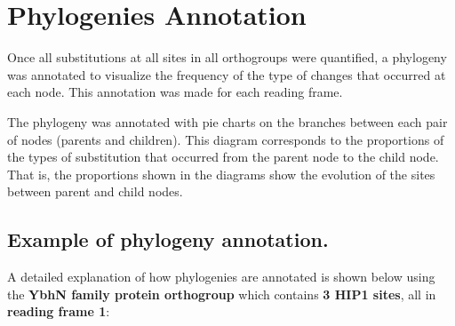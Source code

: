 \documentclass[
]{book}
\begin{document}
\hypertarget{phylogenies-annotation}{%
\section{Phylogenies Annotation}\label{phylogenies-annotation}}

Once all substitutions at all sites in all orthogroups were quantified, a phylogeny was annotated to visualize the frequency of the type of changes that occurred at each node. This annotation was made for each reading frame.

The phylogeny was annotated with pie charts on the branches between each pair of nodes (parents and children). This diagram corresponds to the proportions of the types of substitution that occurred from the parent node to the child node. That is, the proportions shown in the diagrams show the evolution of the sites between parent and child nodes.

\hypertarget{example-of-phylogeny-annotation.}{%
\subsection{Example of phylogeny annotation.}\label{example-of-phylogeny-annotation.}}

A detailed explanation of how phylogenies are annotated is shown below using the \textbf{YbhN family protein orthogroup} which contains \textbf{3 HIP1 sites}, all in \textbf{reading frame 1}:
\end{document}

